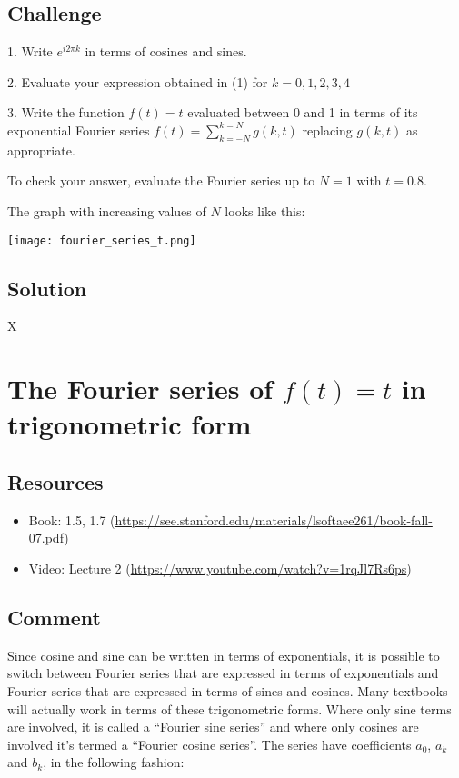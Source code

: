 \subsection*{Challenge}
1. Write $e^{i 2 \pi k}$ in terms of cosines and sines.

2. Evaluate your expression obtained in (1) for $k=0,1,2,3,4$

3. Write the function $f(t)=t$ evaluated between 0 and 1 in terms of its exponential Fourier series $f(t)=\sum_{k=-N}^{k=N} g(k,t)$ replacing $g(k,t)$ as appropriate.

To check your answer, evaluate the Fourier series up to $N=1$ with $t=0.8$.

The graph with increasing values of $N$ looks like this:

\texttt{[image: fourier\_series\_t.png]}

\subsection*{Solution}
X


\timebox




\newpage

\section{The Fourier series of $f(t)=t$ in trigonometric form}
\label{sec:trigexpconvert}

\subsection*{Resources}
\begin{itemize}
    \item Book: 1.5, 1.7 (\url{https://see.stanford.edu/materials/lsoftaee261/book-fall-07.pdf})
    \item Video: Lecture 2 (\url{https://www.youtube.com/watch?v=1rqJl7Rs6ps})
\end{itemize}

\subsection*{Comment}
Since cosine and sine can be written in terms of exponentials, it is possible to switch between Fourier series that are expressed in terms of exponentials and Fourier series that are expressed in terms of sines and cosines. Many textbooks will actually work in terms of these trigonometric forms. Where only sine terms are involved, it is called a ``Fourier sine series'' and where only cosines are involved it's termed a ``Fourier cosine series''. The series have coefficients $a_0$, $a_k$ and $b_k$, in the following fashion:

